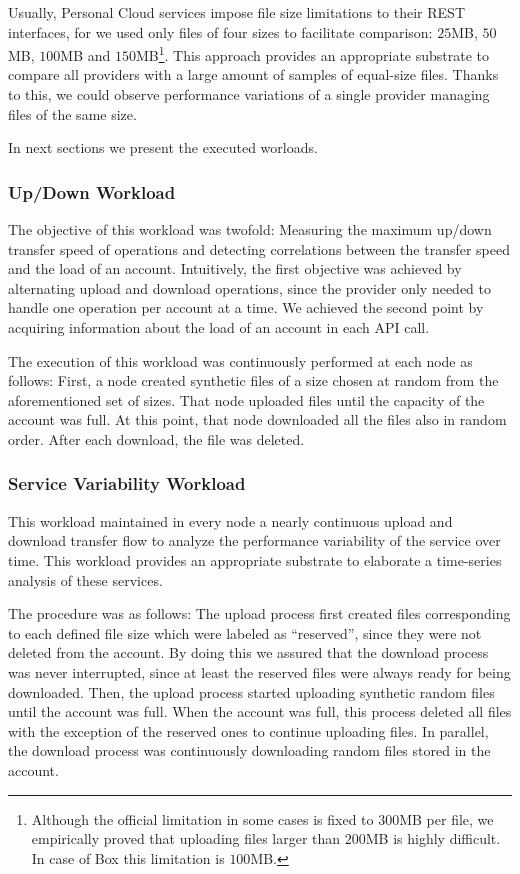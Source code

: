Usually, Personal Cloud services impose file size 
limitations to their REST interfaces, for
we used only files of four sizes to facilitate comparison: $25$MB, $50$MB, 
$100$MB and $150$MB\footnote{Although the official limitation in some cases is fixed
to $300$MB per file, we empirically proved that uploading files
larger than $200$MB is highly difficult. In case of Box this limitation
is $100$MB.}. This approach provides an appropriate substrate 
to compare all providers with a large amount of samples of equal-size files.
Thanks to this, we could observe performance variations of a single provider
managing files of the same size.

In next sections we present the executed worloads.

\subsubsection*{Up/Down Workload}
The objective of this workload
was twofold: Measuring the maximum up/down transfer speed of operations
and detecting correlations between the transfer speed and the load
of an account. Intuitively, the first objective was achieved by alternating upload
and download operations, since the provider only needed to handle one 
operation per account at a time. We achieved the second point
by acquiring information about the load of an account in each API call.

The execution of this workload was continuously performed
at each node as follows: First, a node created synthetic 
files of a size chosen at random from the aforementioned set of sizes.
That node uploaded files until the capacity of the account was full.
At this point, that node downloaded all the files also in random order.
After each download, the file was deleted. 

\subsubsection*{Service Variability Workload}
This workload maintained 
in every node a nearly continuous upload and download transfer flow to analyze the performance 
variability of the service over time. This workload provides an
appropriate substrate to elaborate a time-series analysis of these services.

The procedure was as follows: The upload process first
created files corresponding to each defined file size which
were labeled as ``reserved'', since they were not deleted from the account.
By doing this we assured that the download process was never interrupted,
since at least the reserved files were always ready for being downloaded.
Then, the upload process started uploading synthetic 
random files until the account was full. When the account was full,
this process deleted all files with the exception of the reserved ones
to continue uploading files.
In parallel, the download process was continuously downloading random files
stored in the account. 
 
